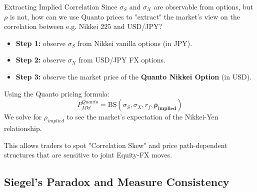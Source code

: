 \documentclass{beamer}
\begin{document}
\begin{frame}{Extracting Implied Correlation}
	Since $\sigma_S$ and $\sigma_X$ are observable from options, but $\rho$ is not, how can we use Quanto prices to "extract" the market's view on the correlation between e.g. Nikkei 225 and USD/JPY?

	\begin{itemize}
		\item \textbf{Step 1:} observe $\sigma_S$ from Nikkei vanilla options (in JPY).
		\item \textbf{Step 2:} observe $\sigma_X$ from USD/JPY FX options.
		\item \textbf{Step 3:} observe the market price of the \textbf{Quanto Nikkei Option} (in USD).
	\end{itemize}

	Using the Quanto pricing formula:
	\[ P_{Mkt}^{Quanto} = \text{BS}(\sigma_S, \sigma_X, r_f, \mathbf{\rho_{implied}}) \]
	We solve for $\rho_{implied}$ to see the market's expectation of the Nikkei-Yen relationship.

	This allows traders to spot "Correlation Skew" and price path-dependent structures that are sensitive to joint Equity-FX moves.
\end{frame}

\subsection{Siegel's Paradox and Measure Consistency}
\end{document}
